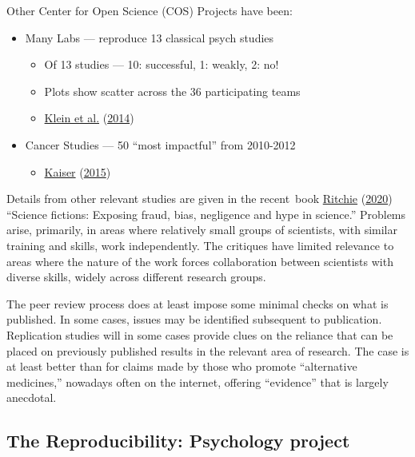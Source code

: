 \documentclass[
  10pt,
  b5paper]{book}
\providecommand{\tightlist}{%
  \setlength{\itemsep}{0pt}\setlength{\parskip}{0pt}}
\begin{document}
Other Center for Open Science (COS) Projects have been:

\begin{itemize}
\tightlist
\item
  Many Labs --- reproduce 13 classical psych studies

  \begin{itemize}
  \tightlist
  \item
    Of 13 studies --- 10: successful, 1: weakly, 2: no!
  \item
    Plots show scatter across the 36 participating teams
  \item
    \protect\hyperlink{ref-r7_klein_others_2014}{Klein et al.} (\protect\hyperlink{ref-r7_klein_others_2014}{2014})
  \end{itemize}
\item
  Cancer Studies --- 50 ``most impactful'' from 2010-2012

  \begin{itemize}
  \tightlist
  \item
    \protect\hyperlink{ref-r5_kaiser_2015}{Kaiser} (\protect\hyperlink{ref-r5_kaiser_2015}{2015})
  \end{itemize}
\end{itemize}

Details from other relevant studies are given in the
recent~book \protect\hyperlink{ref-ritchie2020science}{Ritchie} (\protect\hyperlink{ref-ritchie2020science}{2020}) ``Science fictions: Exposing
fraud, bias, negligence and hype in science.''
Problems arise, primarily, in areas where relatively small
groups of scientists, with similar training and skills, work
independently. The critiques have limited relevance to
areas where the nature of the work forces collaboration
between scientists with diverse skills, widely across
different research groups.

The peer review process does at least impose some minimal
checks on what is published. In some cases, issues may
be identified subsequent to publication. Replication
studies will in some cases provide clues on the reliance
that can be placed on previously published results in the
relevant area of research. The case is at least better
than for claims made by those who promote ``alternative
medicines,'' nowadays often on the internet, offering
``evidence'' that is largely anecdotal.

\hypertarget{the-reproducibility-psychology-project}{%
\subsection*{The Reproducibility: Psychology project}\label{the-reproducibility-psychology-project}}
\end{document}
